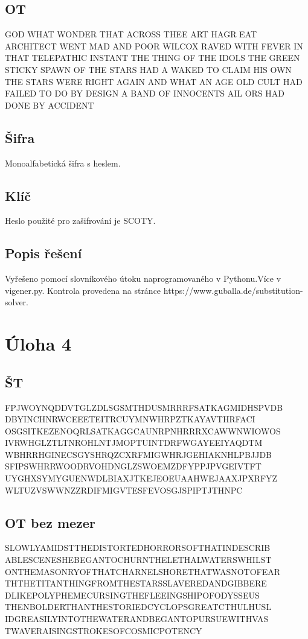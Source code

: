 \documentclass[12pt]{article} %
\begin{document}
\subsection{OT}
GOD WHAT WONDER THAT ACROSS THEE ART HAGR EAT ARCHITECT 
WENT MAD AND POOR WILCOX RAVED WITH FEVER IN THAT TELEPATHIC 
INSTANT THE THING OF THE IDOLS THE GREEN STICKY SPAWN OF THE 
STARS HAD A WAKED TO CLAIM HIS OWN THE STARS WERE RIGHT AGAIN
AND WHAT AN AGE OLD CULT HAD FAILED TO DO BY DESIGN A BAND OF
INNOCENTS AIL ORS HAD DONE BY ACCIDENT
\subsection{Šifra}
Monoalfabetická šifra s heslem.
\subsection{Klíč}
Heslo použité pro zašifrování je SCOTY.
\subsection{Popis řešení}
Vyřešeno pomocí slovníkového útoku naprogramovaného v Pythonu.Více v vigener.py. Kontrola provedena na stránce https://www.guballa.de/substitution-solver. 


\section{Úloha 4}
\subsection{ŠT}
FPJWOYNQDDVTGLZDLSGSMTHDUSMRRRFSATKAGMIDHSPVDB
DBYINCHNRWCEEETEITRCUYMNWHRPZTKAYAVTHRFACI
OSGSITKEZENOQRLSATKAGGCAUNRPNHRRRXCAWWNWIOWOS
IVRWHGLZTLTNROHLNTJMOPTUINTDRFWGAYEEIYAQDTM
WBHRRHGINECSGYSHRQZCXRFMIGWHRJGEHIAKNHLPBJJDB
SFIPSWHRRWOODRVOHDNGLZSWOEMZDFYPPJPVGEIVTFT
UYGHXSYMYGUENWDLBIAXJTKEJEOEUAAHWEJAAXJPXRFYZ
WLTUZVSWWNZZRDIFMIGVTESFEVOSGJSPIPTJTHNPC

\subsection{OT bez mezer}
SLOWLYAMIDSTTHEDISTORTEDHORRORSOFTHATINDESCRIB
ABLESCENESHEBEGANTOCHURNTHELETHALWATERSWHILST
ONTHEMASONRYOFTHATCHARNELSHORETHATWASNOTOFEAR
THTHETITANTHINGFROMTHESTARSSLAVEREDANDGIBBERE
DLIKEPOLYPHEMECURSINGTHEFLEEINGSHIPOFODYSSEUS
THENBOLDERTHANTHESTORIEDCYCLOPSGREATCTHULHUSL
IDGREASILYINTOTHEWATERANDBEGANTOPURSUEWITHVAS
TWAVERAISINGSTROKESOFCOSMICPOTENCY
\end{document}
